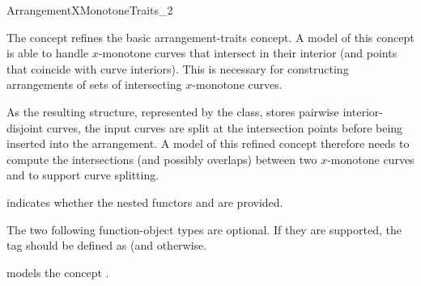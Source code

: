
\ccRefPageBegin
\begin{ccRefConcept}{ArrangementXMonotoneTraits_2}

\ccThreeToTwo

\ccDefinition
The concept\ccRefName{} refines the basic arrangement-traits concept.
A model of this concept is able to handle $x$-monotone curves that
intersect in their interior (and points that coincide with curve
interiors). This is necessary for constructing arrangements of sets of
intersecting $x$-monotone curves.

As the resulting structure, represented by the  class,
stores pairwise interior-disjoint curves, the input curves are split at
the intersection points before being inserted into the arrangement. 
A model of this refined concept therefore needs to compute the intersections
(and possibly overlaps) between two $x$-monotone curves and to support
curve splitting.

\ccRefines
{}

\ccTypes

  {indicates whether the nested functors  and
   are provided.} 

\ccThreeToTwo
{}
\ccGlue
{}

The two following function-object types are optional. If they are
supported, the  tag should be defined as
 (and  otherwise.

%
  {models the concept .}
\ccGlue
{}

\ccThreeToTwo



\end{ccRefConcept}
